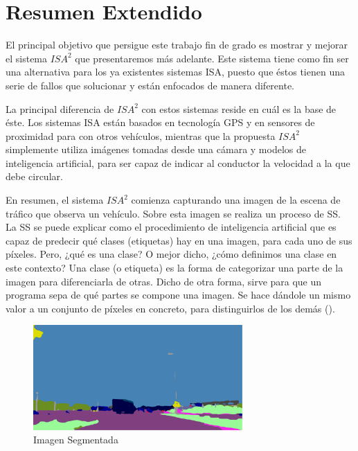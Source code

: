 \chapter{Resumen Extendido}

El principal objetivo que persigue este trabajo fin de grado es mostrar y mejorar el sistema $ISA^{2}$ que presentaremos más adelante. Este sistema tiene como fin ser una alternativa para los ya existentes sistemas \ac{ISA}, puesto que éstos tienen una serie de fallos que solucionar y están enfocados de manera diferente.

La principal diferencia de $ISA^{2}$ con estos sistemas reside en cuál es la base de éste. Los sistemas \ac{ISA} están basados en tecnología \ac{GPS} y en sensores de proximidad para con otros vehículos, mientras que la propuesta $ISA^{2}$ simplemente utiliza imágenes tomadas desde una cámara y modelos de inteligencia artificial, para ser capaz de indicar al conductor la velocidad a la que debe circular.

En resumen, el sistema $ISA^{2}$ comienza capturando una imagen de la escena de tráfico que observa un vehículo. Sobre esta imagen se realiza un proceso de \ac{SS}. La \ac{SS} se puede explicar como el procedimiento de inteligencia artificial que es capaz de predecir qué clases (etiquetas) hay en una imagen, para cada uno de sus píxeles. Pero, ¿qué es una clase? O mejor dicho, ¿cómo definimos una clase en este contexto? Una clase (o etiqueta) es la forma de categorizar una parte de la imagen para diferenciarla de otras. Dicho de otra forma, sirve para que un programa sepa de qué partes se compone una imagen. Se hace dándole un mismo valor a un conjunto de píxeles en concreto, para distinguirlos de los demás (\cite{deeplab}).

\begin{figure}[H]
  \centering
  \includegraphics[width=8cm]{Figuras/Ejemplo_Imagen_Segmentada.eps}
  \caption{Imagen Segmentada}
    \label{fig:ImgSeg}
\end{figure}

